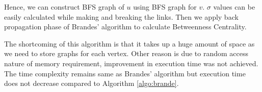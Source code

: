 Hence, we can construct BFS graph of $u$ using BFS graph for $v$.
$\sigma$ values can be easily calculated while making and breaking the links. Then we apply back propagation phase of Brandes' algorithm to calculate Betweenness Centrality. 

The shortcoming of this algorithm is that it takes up a huge amount of space as we need to store graphs for each vertex. Other reason is due to random access nature of memory requirement, improvement in execution time was not achieved. The time complexity remains same as Brandes' algorithm but execution time does not decrease compared to Algorithm \ref{algo:brande}.






